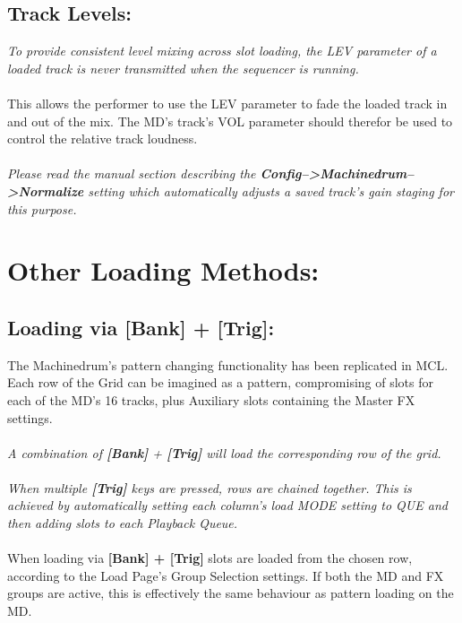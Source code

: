 \section{Track Levels:}
\textit{To provide consistent level mixing across slot loading, the LEV parameter of a loaded track is never transmitted when the sequencer is running.}\\\\This allows the performer to use the LEV parameter to fade the loaded track in and out of the mix. The MD's track's VOL parameter should therefor be used to control the relative track loudness.\\\\
\textit{Please read the manual section describing the \textbf{Config-->Machinedrum-->Normalize} setting which automatically adjusts a saved track's gain staging for this purpose.}

\chapter{Other Loading Methods:}
\section{Loading via [Bank] + [Trig]:}
The Machinedrum's pattern changing functionality has been replicated in MCL. Each row of the Grid can be imagined as a pattern, compromising of slots for each of the MD's 16 tracks, plus Auxiliary slots containing the Master FX settings.\\
\\
\textit{A combination of \textbf{[Bank]} + \textbf{[Trig]} will load the corresponding row of the grid.\\\\
When multiple \textbf{[Trig]} keys are pressed, rows are chained together. This is achieved by automatically setting each column's load MODE setting to QUE and then adding slots to each Playback Queue.}
\\\\
When loading via \textbf{[Bank] + [Trig]} slots are loaded from the chosen row, according to the Load Page's Group Selection settings. If both the MD and FX groups are active, this is effectively the same behaviour as pattern loading on the MD.

